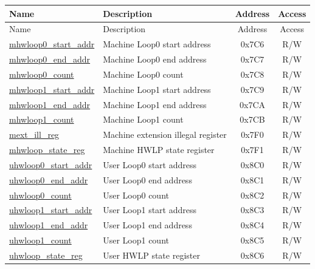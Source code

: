 \begin{longtable}{ | p{4.0cm} | p{8.4cm} | c | c| }
\hline\rowcolor{lightgray}
Name & Description & Address & Access \\ \hline
\endfirsthead
\hline
\rowcolor{lightgray}
Name & Description & Address & Access  \\
\hline
\endhead
\endfoot
\hyperref[sec:riscvcpu-hwloop-reg-desc]{mhwloop0\_start\_addr} & Machine Loop0 start address & 0x7C6 & R/W \\\hline
\hyperref[sec:riscvcpu-hwloop-reg-desc]{mhwloop0\_end\_addr} & Machine Loop0 end address & 0x7C7 & R/W \\\hline
\hyperref[sec:riscvcpu-hwloop-reg-desc]{mhwloop0\_count} & Machine Loop0 count & 0x7C8 & R/W \\\hline
\hyperref[sec:riscvcpu-hwloop-reg-desc]{mhwloop1\_start\_addr} & Machine Loop1 start address & 0x7C9 & R/W \\\hline
\hyperref[sec:riscvcpu-hwloop-reg-desc]{mhwloop1\_end\_addr} & Machine Loop1 end address & 0x7CA & R/W \\\hline
\hyperref[sec:riscvcpu-hwloop-reg-desc]{mhwloop1\_count} & Machine Loop1 count & 0x7CB & R/W \\\hline
\hyperref[sec:riscvcpu-hwloop-reg-desc]{mext\_ill\_reg} & Machine extension illegal register & 0x7F0 & R/W \\\hline
\hyperref[sec:riscvcpu-hwloop-reg-desc]{mhwloop\_state\_reg} & Machine HWLP state register & 0x7F1 & R/W \\\hline
\hyperref[sec:riscvcpu-hwloop-reg-desc]{uhwloop0\_start\_addr} & User Loop0 start address & 0x8C0 & R/W \\\hline
\hyperref[sec:riscvcpu-hwloop-reg-desc]{uhwloop0\_end\_addr} & User Loop0 end address & 0x8C1 & R/W \\\hline
\hyperref[sec:riscvcpu-hwloop-reg-desc]{uhwloop0\_count} & User Loop0 count & 0x8C2 & R/W \\\hline
\hyperref[sec:riscvcpu-hwloop-reg-desc]{uhwloop1\_start\_addr} & User Loop1 start address & 0x8C3 & R/W \\\hline
\hyperref[sec:riscvcpu-hwloop-reg-desc]{uhwloop1\_end\_addr} & User Loop1 end address & 0x8C4 & R/W \\\hline
\hyperref[sec:riscvcpu-hwloop-reg-desc]{uhwloop1\_count} & User Loop1 count & 0x8C5 & R/W \\\hline
\hyperref[sec:riscvcpu-hwloop-reg-desc]{uhwloop\_state\_reg} & User HWLP state register & 0x8C6 & R/W \\\hline
\end{longtable}
